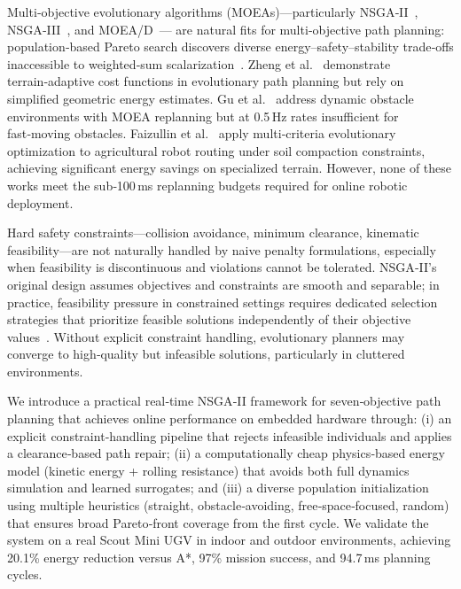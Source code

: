 \documentclass[lettersize,journal]{IEEEtran}
\begin{document}
Multi‑objective evolutionary algorithms (MOEAs)—particularly
NSGA‑II~\cite{Deb2002}, NSGA‑III~\cite{Deb2014}, and MOEA/D~\cite{Zhang2007}—
are natural fits for multi‑objective path planning: population‑based Pareto
search discovers diverse energy–safety–stability trade‑offs inaccessible to
weighted‑sum scalarization~\cite{Zheng2023moea,Gu2022mopp,Faizullin2025mo}.
Zheng et al.~\cite{Zheng2023moea} demonstrate terrain‑adaptive cost functions
in evolutionary path planning but rely on simplified geometric energy estimates.
Gu et al.~\cite{Gu2022mopp} address dynamic obstacle environments with MOEA
replanning but at 0.5\,Hz rates insufficient for fast‑moving obstacles.
Faizullin et al.~\cite{Faizullin2025mo} apply multi‑criteria evolutionary
optimization to agricultural robot routing under soil compaction constraints,
achieving significant energy savings on specialized terrain. However, none of
these works meet the sub‑100\,ms replanning budgets required for online robotic
deployment.

Hard safety constraints—collision avoidance, minimum clearance, kinematic
feasibility—are not naturally handled by naive penalty formulations, especially
when feasibility is discontinuous and violations cannot be tolerated. NSGA‑II's
original design assumes objectives and constraints are smooth and separable;
in practice, feasibility pressure in constrained settings requires dedicated
selection strategies that prioritize feasible solutions independently of their
objective values~\cite{Deb2002,Chen2024safety}. Without explicit constraint
handling, evolutionary planners may converge to high‑quality but infeasible
solutions, particularly in cluttered environments.

We introduce a practical real‑time NSGA‑II framework for seven‑objective path
planning that achieves online performance on embedded hardware through:
(i) an explicit constraint‑handling pipeline that rejects infeasible
individuals and applies a clearance‑based path repair;
(ii) a computationally cheap physics‑based energy model (kinetic energy
+ rolling resistance) that avoids both full dynamics simulation and learned
surrogates; and
(iii) a diverse population initialization using multiple heuristics (straight,
obstacle‑avoiding, free‑space‑focused, random) that ensures broad Pareto‑front
coverage from the first cycle.
We validate the system on a real Scout Mini UGV in indoor and outdoor
environments, achieving 20.1\% energy reduction versus A*, 97\% mission
success, and 94.7\,ms planning cycles.
\end{document}
